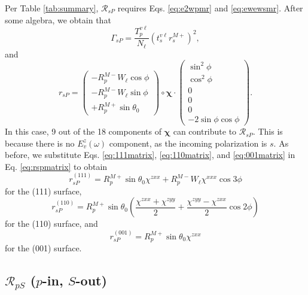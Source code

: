 \documentclass[aps,pra,10pt,amsmath,notitlepage,letterpaper]{revtex4-1}
\begin{document}
Per Table \ref{tab:summary}, $\mathcal{R}_{sP}$ requires Eqs. \eqref{eq:e2wpmr}
and \eqref{eq:ewewsmr}. After some algebra, we obtain that
\begin{equation}\label{mcv4}
\Gamma_{sP}=
\frac{T^{v\ell}_{p}}{N_{\ell}}
\left(t^{v\ell}_{s}r^{M+}_{s}\right)^{2},
\end{equation}
and
\begin{equation}\label{eq:rspmatrix}
r_{sP} =
\begin{pmatrix}
-R^{M-}_{p}W_{\ell}\cos\phi \\[3pt]
-R^{M-}_{p}W_{\ell}\sin\phi \\[3pt]
+R^{M+}_{p}\sin\theta_{0}
\end{pmatrix}
\circ
\boldsymbol{\chi}
\cdot
\begin{pmatrix}
\sin^{2}\phi\\
\cos^{2}\phi\\
0\\
0\\
0\\
- 2\sin\phi\cos\phi
\end{pmatrix}
.
\end{equation}
In this case, 9 out of the 18 components of $\boldsymbol{\chi}$ can contribute
to $\mathcal{R}_{sP}$. This is because there is no $E^z_v(\omega)$ component,
as the incoming polarization is $s$. As before, we substitute Eqs.
\eqref{eq:111matrix}, \eqref{eq:110matrix}, and \eqref{eq:001matrix} in Eq.
\eqref{eq:rspmatrix} to obtain
\begin{equation}\label{eq:rsp111}
r^{(111)}_{sP} = 
R^{M+}_{p}\sin\theta_{0}\chi^{zxx} +
R^{M-}_{p}W_{\ell}\chi^{xxx}\cos3\phi
\end{equation}
for the (111) surface,
\begin{equation}\label{eq:rsp110}
r^{(110)}_{sP} = 
R^{M+}_{p}\sin\theta_{0}
\left(
\frac{\chi^{zxx} + \chi^{zyy}}{2} + \frac{\chi^{zyy} - \chi^{zxx}}{2}\cos2\phi
\right)
\end{equation}
for the (110) surface, and
\begin{equation}\label{eq:rsp001}
r^{(001)}_{sP} = R^{M+}_{p}\sin\theta_{0}\chi^{zxx}
\end{equation}
for the (001) surface.



\subsection{\texorpdfstring{$\mathcal{R}_{pS}$ ($p$-in, $S$-out)} {RpS (p-in,
S-out)}}
\label{sec:RpS}
\end{document}

